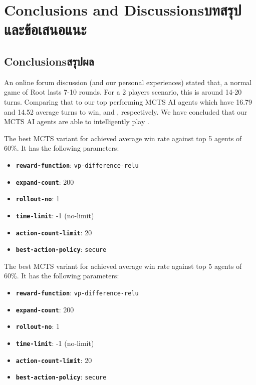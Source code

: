 \chapter{\ifenglish Conclusions and Discussions\else บทสรุปและข้อเสนอแนะ\fi}

\section{\ifenglish Conclusions\else สรุปผล\fi}

An online forum discussion (and our personal experiences) stated that, a normal game of Root lasts 7-10 rounds. For a 2 players scenario, this is around 14-20 turns. Comparing that to our top performing MCTS AI agents which have 16.79 and 14.52 average turns to win, \Marquise{} and \Eyrie{}, respectively. We have concluded that our MCTS AI agents are able to intelligently play \RootB{}.

The best MCTS variant for \Marquise{} achieved average win rate against top 5 \Eyrie{} agents of 60\%. It has the following parameters:
\begin{itemize}
    \item \textbf{\texttt{reward-function}}: \texttt{vp-difference-relu}
    \item \textbf{\texttt{expand-count}}: 200
    \item \textbf{\texttt{rollout-no}}: 1
    \item \textbf{\texttt{time-limit}}: -1 (no-limit)
    \item \textbf{\texttt{action-count-limit}}: 20
    \item \textbf{\texttt{best-action-policy}}: \texttt{secure}
\end{itemize}
The best MCTS variant for \Eyrie{} achieved average win rate against top 5 \Marquise{} agents of 60\%. It has the following parameters:
\begin{itemize}
    \item \textbf{\texttt{reward-function}}: \texttt{vp-difference-relu}
    \item \textbf{\texttt{expand-count}}: 200
    \item \textbf{\texttt{rollout-no}}: 1
    \item \textbf{\texttt{time-limit}}: -1 (no-limit)
    \item \textbf{\texttt{action-count-limit}}: 20
    \item \textbf{\texttt{best-action-policy}}: \texttt{secure}
\end{itemize}

